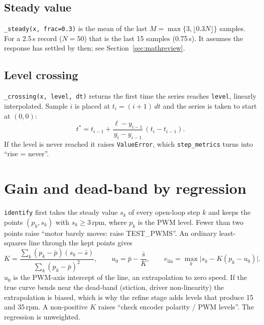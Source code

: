 \documentclass[11pt,a4paper]{report}
\newcommand{\code}[1]{\texttt{#1}}
\begin{document}
\subsection*{Steady value}
\code{\_steady(x, frac=0.3)} is the mean of the last $M=\max\{3,\lfloor0.3N\rfloor\}$ samples. For a 2.5\,s record ($N=50$) that is the last 15 samples (0.75\,s). It assumes the response has settled by then; see Section~\ref{sec:mathreview}.

\subsection*{Level crossing}
\code{\_crossing(x, level, dt)} returns the first time the series reaches \code{level}, linearly interpolated. Sample $i$ is placed at $t_i=(i+1)\,dt$ and the series is taken to start at $(0,0)$:
\begin{equation}
  t^\ast=t_{i-1}+\frac{\ell-y_{i-1}}{y_i-y_{i-1}}\,(t_i-t_{i-1}).
\end{equation}
If the level is never reached it raises \code{ValueError}, which \code{step\_metrics} turns into ``rise = never''.

\section{Gain and dead-band by regression}\label{sec:ident-ols}
\code{identify} first takes the steady value $s_k$ of every open-loop step $k$ and keeps the points $(p_k,s_k)$ with $s_k\ge 3$\,rpm, where $p_k$ is the PWM level. Fewer than two points raise ``motor barely moves: raise TEST\_PWMS''. An ordinary least-squares line through the kept points gives
\begin{equation}
  K=\frac{\sum_k (p_k-\bar p)(s_k-\bar s)}{\sum_k (p_k-\bar p)^2},\qquad
  u_0=\bar p-\frac{\bar s}{K},\qquad
  e_{\text{lin}}=\max_k\bigl|s_k-K(p_k-u_0)\bigr|.
\end{equation}
$u_0$ is the PWM-axis intercept of the line, an extrapolation to zero speed. If the true curve bends near the dead-band (stiction, driver non-linearity) the extrapolation is biased, which is why the refine stage adds levels that produce 15 and 35\,rpm. A non-positive $K$ raises ``check encoder polarity / PWM levels''. The regression is unweighted.
\end{document}

